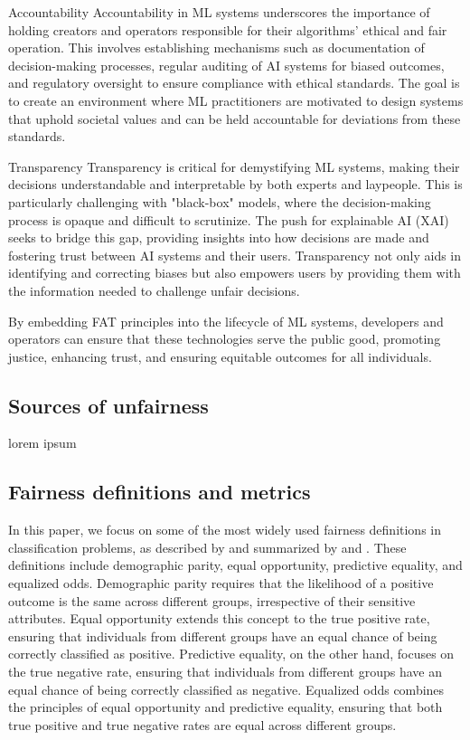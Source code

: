 Accountability
Accountability in ML systems underscores the importance of holding creators and operators responsible for their algorithms' ethical and fair operation. This involves establishing mechanisms such as documentation of decision-making processes, regular auditing of AI systems for biased outcomes, and regulatory oversight to ensure compliance with ethical standards. The goal is to create an environment where ML practitioners are motivated to design systems that uphold societal values and can be held accountable for deviations from these standards.

Transparency
Transparency is critical for demystifying ML systems, making their decisions understandable and interpretable by both experts and laypeople. This is particularly challenging with "black-box" models, where the decision-making process is opaque and difficult to scrutinize. The push for explainable AI (XAI) seeks to bridge this gap, providing insights into how decisions are made and fostering trust between AI systems and their users. Transparency not only aids in identifying and correcting biases but also empowers users by providing them with the information needed to challenge unfair decisions.

By embedding FAT principles into the lifecycle of ML systems, developers and operators can ensure that these technologies serve the public good, promoting justice, enhancing trust, and ensuring equitable outcomes for all individuals.

\subsection{Sources of unfairness}


lorem ipsum

\subsection{Fairness definitions and metrics}

In this paper, we focus on some of the most widely used fairness definitions in classification problems, as described by \cite{Verma2018} and summarized by \cite{Mehrabi2019} and \cite{caton2023}. These definitions include demographic parity, equal opportunity, predictive equality, and equalized odds. Demographic parity requires that the likelihood of a positive outcome is the same across different groups, irrespective of their sensitive attributes. Equal opportunity extends this concept to the true positive rate, ensuring that individuals from different groups have an equal chance of being correctly classified as positive. Predictive equality, on the other hand, focuses on the true negative rate, ensuring that individuals from different groups have an equal chance of being correctly classified as negative. Equalized odds combines the principles of equal opportunity and predictive equality, ensuring that both true positive and true negative rates are equal across different groups.

